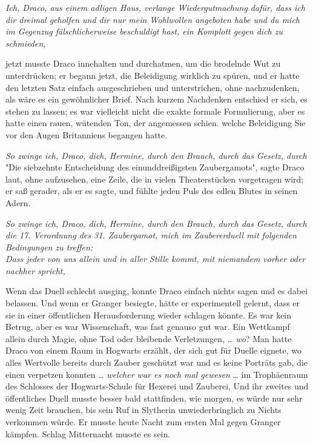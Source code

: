 {\emph{Ich, Draco, aus einem adligen Haus, verlange Wiedergutmachung dafür, dass ich dir dreimal geholfen und dir nur mein Wohlwollen angeboten habe und du mich im Gegenzug fälschlicherweise beschuldigt hast, ein Komplott gegen dich zu schmieden},

jetzt musste Draco innehalten und durchatmen, um die brodelnde Wut zu unterdrücken; er begann jetzt, die Beleidigung wirklich zu spüren, und er hatte den letzten Satz einfach ausgeschrieben und unterstrichen, ohne nachzudenken, als wäre es ein gewöhnlicher Brief. Nach kurzem Nachdenken entschied er sich, es stehen zu lassen; es war vielleicht nicht die exakte formale Formulierung, aber es hatte einen rauen, wütenden Ton, der angemessen schien. welche Beleidigung Sie vor den Augen Britanniens begangen hatte.

\emph{So zwinge ich, Draco, dich, Hermine, durch den Brauch, durch das Gesetz, durch}\\ "Die siebzehnte Entscheidung des einunddreißigsten Zaubergamots", sagte Draco laut, ohne aufzusehen, eine Zeile, die in vielen Theaterstücken vorgetragen wird; er saß gerader, als er es sagte, und fühlte jeden Puls des edlen Blutes in seinen Adern.

\emph{So zwinge ich, Draco, dich, Hermine, durch den Brauch, durch das Gesetz, durch die 17. Verordnung des 31. Zaubergamot, mich im Zaubererduell mit folgenden Bedingungen zu treffen:}\\ \emph{Dass jeder von uns allein und in aller Stille kommt, mit niemandem vorher oder nachher spricht,}

Wenn das Duell schlecht ausging, konnte Draco einfach nichts sagen und es dabei belassen. Und wenn er Granger besiegte, hätte er experimentell gelernt, dass er sie in einer öffentlichen Herausforderung wieder schlagen könnte. Es war kein Betrug, aber es war Wissenschaft, was fast genauso gut war. Ein Wettkampf allein durch Magie, ohne Tod oder bleibende Verletzungen, … \emph{wo}? Man hatte Draco von einem Raum in Hogwarts erzählt, der sich gut für Duelle eignete, wo alles Wertvolle bereits durch Zauber geschützt war und es keine Porträts gab, die einen verpetzen konnten … \emph{welcher war es noch mal gewesen} … im Trophäenraum des Schlosses der Hogwarts-Schule für Hexerei und Zauberei, Und ihr zweites und öffentliches Duell musste besser bald stattfinden, wie morgen, es würde nur sehr wenig Zeit brauchen, bis sein Ruf in Slytherin unwiederbringlich zu Nichts verkommen würde. Er musste heute Nacht zum ersten Mal gegen Granger kämpfen. Schlag Mitternacht musste es sein.

}
